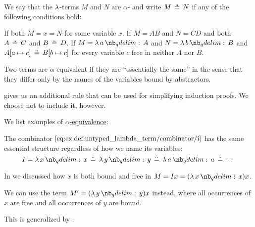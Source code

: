 \begin{definition}\label{def:untyped_lambda_term_alpha_equivalence}\mimprovised
  We say that the \( \mathrm{\lambda} \)-terms \( M \) and \( N \) are \( \alpha \)- and write \( M \aequiv N \) if any of the following conditions hold:
  \begin{thmenum}
     If both \( M = x = N \) for some variable \( x \).
     If \( M = A B \) and \( N = C D \) and both \( A \aequiv C \) and \( B \aequiv D \).
     If \( M = \qabs a A \) and \( N = \qabs b B \) and \( A[a \mapsto c] \aequiv B[b \mapsto c] \) for every variable \( c \) free in neither \( A \) nor \( B \).
  \end{thmenum}
\end{definition}
\begin{comments}
  \item Two terms are \( \alpha \)-equivalent if they are \enquote{essentially the same} in the sense that they differ only by the names of the variables bound by abstractors.

  \item {} gives us an additional rule that can be used for simplifying induction proofs. We choose not to include it, however.
\end{comments}

\begin{example}\label{ex:def:untyped_lambda_term_alpha_equivalence}
  We list examples of \hyperref[def:untyped_lambda_term_alpha_equivalence]{\( \alpha \)-equivalence}:
  \begin{thmenum}
     The combinator \( \ref{eq:ex:def:untyped_lambda_term/combinator/i} \) has the same essential structure regardless of how we name its variables:
    \begin{equation*}
      I = \qabs x x \aequiv \qabs y y \aequiv \qabs a a \aequiv \cdots
    \end{equation*}

     In  we discussed how \( x \) is both bound and free in \( M = Ix = (\qabs x x) x \).

    We can use the term \( M' = (\qabs y y) x \) instead, where all occurrences of \( x \) are free and all occurrences of \( y \) are bound.

    This is generalized by .
  \end{thmenum}
\end{example}

